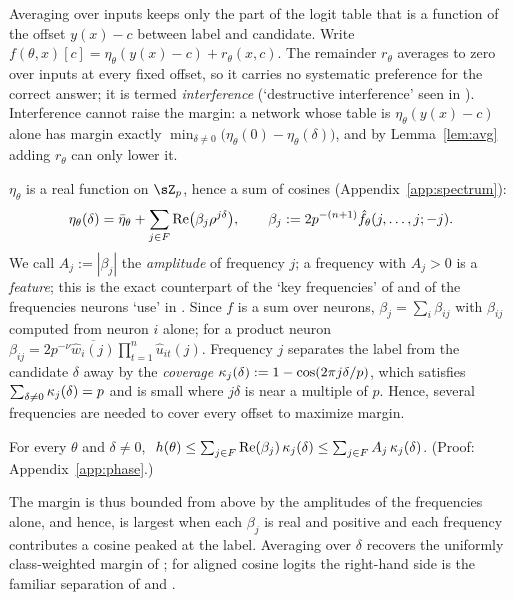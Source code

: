 Averaging over inputs keeps only the part of the logit table that is a function of the offset $y(x)-c$ between label and candidate. Write $f(\theta,x)[c]=\eta_\theta(y(x)-c)+r_\theta(x,c)$. The remainder $r_\theta$ averages to zero over inputs at every fixed offset, so it carries no systematic preference for the correct answer; it is termed \emph{interference} (`destructive interference' seen in \citealp{gromov2023grokking}). Interference cannot raise the margin: a network whose table is $\eta_\theta(y(x)-c)$ alone has margin exactly $\min_{\delta\neq0}\big(\eta_\theta(0)-\eta_\theta(\delta)\big)$, and by Lemma~\ref{lem:avg} adding $r_\theta$ can only lower it.

$\eta_\theta$ is a real function on $\sZ_p$, hence a sum of cosines (Appendix~\ref{app:spectrum}):
\begin{equation}
  \eta_\theta(\delta)=\bar\eta_\theta+\sum_{j\in F}\mathrm{Re}\big(\beta_j\rho^{j\delta}\big),\qquad\beta_j:=2p^{-(n+1)}\hat f_\theta(j,\dots,j;-j).
  \label{eq:spectrum}
\end{equation}
We call $A_j:=|\beta_j|$ the \emph{amplitude} of frequency $j$; a frequency with $A_j>0$ is a \emph{feature}; this is the exact counterpart of the `key frequencies' of \citet{nanda2023progress} and of the frequencies neurons `use' in \citet{morwani2024feature}. Since $f$ is a sum over neurons, $\beta_j=\sum_i\beta_{ij}$ with $\beta_{ij}$ computed from neuron $i$ alone; for a product neuron $\beta_{ij}=2p^{-\nu}\overline{\hat w_i(j)}\prod_{t=1}^{n}\hat u_{it}(j)$. Frequency $j$ separates the label from the candidate $\delta$ away by the \emph{coverage} $\kappa_{j}(\delta):=1-\cos(2\pi j\delta/p)$, which satisfies $\sum_{\delta\neq0}\kappa_{j}(\delta)=p$ and is small where $j\delta$ is near a multiple of $p$. Hence, several frequencies are needed to cover every offset to maximize margin.

\begin{lemma}\label{lem:phase}
For every $\theta$ and $\delta\neq0$, $\ h(\theta)\le\sum_{j\in\Fp}\mathrm{Re}(\beta_j)\,\cov{j}{\delta}\le\sum_{j\in\Fp}A_j\,\cov{j}{\delta}$. (Proof: Appendix~\ref{app:phase}.)
\end{lemma}

The margin is thus bounded from above by the amplitudes of the frequencies alone, and hence, is largest when each $\beta_j$ is real and positive and each frequency contributes a cosine peaked at the label. Averaging over $\delta$ recovers the uniformly class-weighted margin of \citet[App.~F.1]{morwani2024feature}; for aligned cosine logits the right-hand side is the familiar separation of \citet[Sec.~4.2]{nanda2023progress} and \citet[Thm.~4.7]{mccracken2025}.


